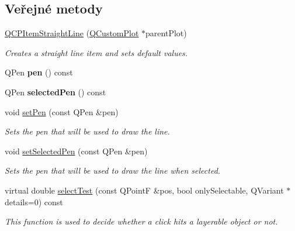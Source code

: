 \subsection*{Veřejné metody}
\begin{DoxyCompactItemize}
\item 
\hyperlink{classQCPItemStraightLine_a41fd2e1f006983449eca9830930c3b10}{Q\+C\+P\+Item\+Straight\+Line} (\hyperlink{classQCustomPlot}{Q\+Custom\+Plot} $\ast$parent\+Plot)
\begin{DoxyCompactList}\small\item\em Creates a straight line item and sets default values. \end{DoxyCompactList}\item 
\hypertarget{classQCPItemStraightLine_ad858ab1a444391aab778f765453ea222}{}Q\+Pen {\bfseries pen} () const \label{classQCPItemStraightLine_ad858ab1a444391aab778f765453ea222}

\item 
\hypertarget{classQCPItemStraightLine_a9e33ae966a7e2ea1083b3b9aeabeaea5}{}Q\+Pen {\bfseries selected\+Pen} () const \label{classQCPItemStraightLine_a9e33ae966a7e2ea1083b3b9aeabeaea5}

\item 
void \hyperlink{classQCPItemStraightLine_a9f36c9c9e60d7d9ac084c80380ac8601}{set\+Pen} (const Q\+Pen \&pen)
\begin{DoxyCompactList}\small\item\em Sets the pen that will be used to draw the line. \end{DoxyCompactList}\item 
void \hyperlink{classQCPItemStraightLine_a5c33559498d33543fa95cf0a36e851ff}{set\+Selected\+Pen} (const Q\+Pen \&pen)
\begin{DoxyCompactList}\small\item\em Sets the pen that will be used to draw the line when selected. \end{DoxyCompactList}\item 
virtual double \hyperlink{classQCPItemStraightLine_a64cc3796f58ce856012732603edb2f1c}{select\+Test} (const Q\+Point\+F \&pos, bool only\+Selectable, Q\+Variant $\ast$details=0) const 
\begin{DoxyCompactList}\small\item\em This function is used to decide whether a click hits a layerable object or not. \end{DoxyCompactList}\end{DoxyCompactItemize}

